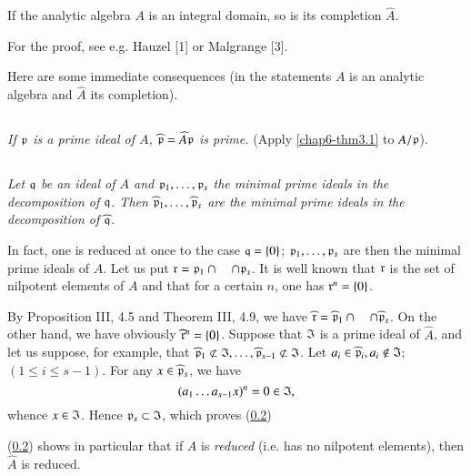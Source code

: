 \begin{theorem}\label{chap6-thm3.1}
If the analytic algebra $A$ is an integral domain, so is its completion $\widehat{A}$.
\end{theorem}

For the proof, see e.g. Hauzel [1] or Malgrange [3].

Here are some immediate consequences (in the statements $A$ is an analytic algebra and $\widehat{A}$ its completion).

\setcounter{subsection}{1}
\subsection{}\label{chap6-sec3.2}
{\em If $\mathfrak{p}$ is a prime ideal of $A$, $\widehat{\mathfrak{p}}=\widehat{A}\mathfrak{p}$ is prime.} (Apply \eqref{chap6-thm3.1} to $A/\mathfrak{p}$).

\subsection{}\label{chap6-sec3.3}
{\em Let $\mathfrak{q}$ be an ideal of $A$ and $\mathfrak{p}_{1},\ldots,\mathfrak{p}_{s}$ the minimal prime ideals in the decomposition of $\mathfrak{q}$. Then $\widehat{\mathfrak{p}}_{1},\ldots,\widehat{\mathfrak{p}}_{s}$ are the minimal prime ideals in the decomposition of $\widehat{\mathfrak{q}}$.}

In fact, one is reduced at once to the case $\mathfrak{q}=\{0\}$; $\mathfrak{p}_{1},\ldots,\mathfrak{p}_{s}$ are then the minimal prime ideals of $A$. Let us put $\mathfrak{r}=\mathfrak{p}_{1}\cap\quad \cap \mathfrak{p}_{s}$. It is well known that $\mathfrak{r}$ is the set of nilpotent elements of $A$ and that for a certain $n$, one has $\mathfrak{r}^{n}=\{0\}$.

By Proposition III, 4.5 and Theorem III, 4.9, we have $\widehat{\mathfrak{r}}=\widehat{\mathfrak{p}}_{1}\cap\quad\cap \widehat{\mathfrak{p}}_{s}$. On the other hand, we have obviously $\widehat{\mathfrak{r}}^{n}=\{0\}$. Suppose that $\mathfrak{I}$ is a prime ideal of $\widehat{A}$, and let us suppose, for example, that $\widehat{\frakp}_{1}\nsubset \frakI,\ldots,\widehat{\frakp}_{s-1}\nsubset \frakI$. Let $a_{i}\in \widehat{\mathfrak{p}}_{i},a_{i}\not\in \mathfrak{I}$; $(1\leq i\leq s-1)$. For any $x\in \widehat{\mathfrak{p}}_{s}$, we have
$$
(a_{1}\ldots a_{s-1}x)^{n}=0\in\mathfrak{I},
$$
whence $x\in \mathfrak{I}$. Hence $\mathfrak{p}_{s}\subset \mathfrak{I}$, which proves (\ref{chap6-sec3.3})

(\ref{chap6-sec3.3}) shows in particular that if $A$ is {\em reduced} (i.e. has no nilpotent elements), then $\widehat{A}$ is reduced.

